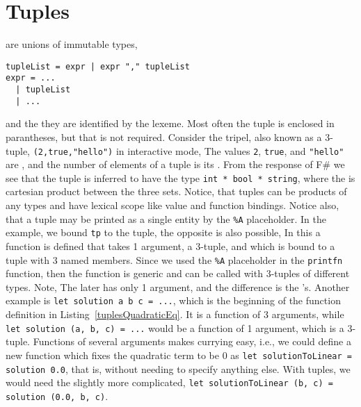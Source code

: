 \section{Tuples}
 are unions of immutable types, 
%
\begin{lstlisting}[language=ebnf]
tupleList = expr | expr "," tupleList
expr = ... 
  | tupleList
  | ...
\end{lstlisting}
%
and the they are identified by the \lexeme{,} lexeme. Most often the tuple is enclosed in parantheses, but that is not required. Consider the tripel, also known as a 3-tuple, \lstinline!(2,true,"hello")! in interactive mode,
%
%
The values \lstinline!2!, \lstinline!true!, and \lstinline!"hello"! are , and the number of elements of a tuple is its . From the response of F\# we see that the tuple is inferred to have the type \lstinline!int * bool * string!, where the \lexeme{*} is cartesian product between the three sets.  Notice, that tuples can be products of any types and have lexical scope like value and function bindings. Notice also, that a tuple may be printed as a single entity by the \lstinline!%A! placeholder. In the example, we bound \lstinline!tp! to the tuple, the opposite is also possible,
%
%
In this a function is defined that takes 1 argument, a 3-tuple, and which is bound to a tuple with 3 named members. Since we used the \lstinline!%A! placeholder in the \lstinline!printfn! function, then the function is generic and can be called with 3-tuples of different types. Note,   The later has only 1 argument, and the difference is the \lexeme{,}'s. Another example is \lstinline!let solution a b c = ...!, which is the beginning of the function definition in Listing~\ref{tuplesQuadraticEq}. It is a function of 3 arguments, while \lstinline!let solution (a, b, c) = ...! would be a function of 1 argument, which is a 3-tuple. Functions of several arguments makes currying easy, i.e., we could define a new function which fixes the quadratic term to be 0 as \lstinline!let solutionToLinear = solution 0.0!, that is, without needing to specify anything else. With tuples, we would need the slightly more complicated, \lstinline!let solutionToLinear (b, c) = solution (0.0, b, c)!.

